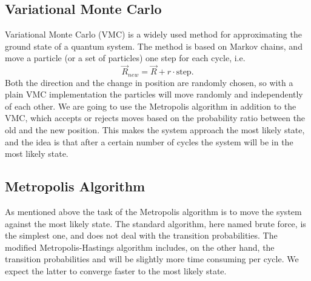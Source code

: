 \documentclass[norsk,a4paper,12pt]{article}
\begin{document}
\subsection{Variational Monte Carlo}\label{VMC}
Variational Monte Carlo (VMC) is a widely used method for approximating the ground state of a quantum system. The method is based on Markov chains, and move a particle (or a set of particles) one step for each cycle, i.e.
\begin{equation}
\vec{R}_{new} = \vec{R} + r\cdot \text{step}.
\end{equation}
Both the direction and the change in position are randomly chosen, so with a plain VMC implementation the particles will move randomly and independently of each other. We are going to use the Metropolis algorithm in addition to the VMC, which accepts or rejects moves based on the probability ratio between the old and the new position. This makes the system approach the most likely state, and the idea is that after a certain number of cycles the system will be in the most likely state. 

\subsection{Metropolis Algorithm}
As mentioned above the task of the Metropolis algorithm is to move the system against the most likely state. The standard algorithm, here named brute force, is the simplest one, and does not deal with the transition probabilities. The modified Metropolis-Hastings algorithm includes, on the other hand, the transition probabilities and will be slightly more time consuming per cycle. We expect the latter to converge faster to the most likely state. 
\end{document}
